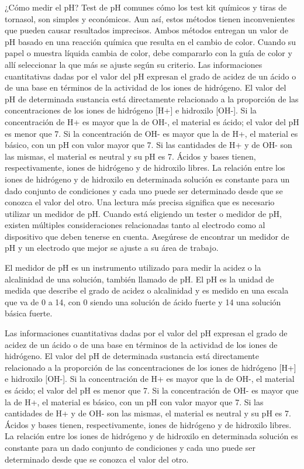 

¿Cómo medir el pH?
Test de pH comunes cómo los test kit químicos y tiras de tornasol, son simples y económicos. Aun así, estos métodos tienen inconvenientes que pueden causar resultados imprecisos. Ambos métodos entregan un valor de pH basado en una reacción química que resulta en el cambio de color. Cuando su papel o muestra líquida cambia de color, debe compararlo con la guía de color y allí seleccionar la que más se ajuste según su criterio.
Las informaciones cuantitativas dadas por el valor del pH expresan el grado de acidez de un ácido o de una base en términos de la actividad de los iones de hidrógeno. El valor del pH de determinada sustancia está directamente relacionado a la proporción de las concentraciones de los iones de hidrógeno [H+] e hidroxilo [OH-]. 
Si la concentración de H+ es mayor que la de OH-, el material es ácido; el valor del pH es menor que 7. 
Si la concentración de OH- es mayor que la de H+, el material es básico, con un pH con valor mayor que 7. 
Si las cantidades de H+ y de OH- son las mismas, el material es neutral y su pH es 7. Ácidos y bases tienen, respectivamente, iones de hidrógeno y de hidroxilo libres. La relación entre los iones de hidrógeno y de hidroxilo en determinada solución es constante para un dado conjunto de condiciones y cada uno puede ser determinado desde que se conozca el valor del otro.
Una lectura más precisa significa que es necesario utilizar un medidor de pH. Cuando está eligiendo un tester o medidor de pH, existen múltiples consideraciones relacionadas tanto al electrodo como al dispositivo que deben tenerse en cuenta. Asegúrese de encontrar un medidor de pH y un electrodo que mejor se ajuste a su área de trabajo.


El medidor de pH es un instrumento utilizado para medir la acidez o la alcalinidad de una solución, también llamado de pH. El pH es la unidad de medida que describe el grado de acidez o alcalinidad y es medido en una escala que va de 0 a 14, con 0 siendo una solución de ácido fuerte y 14 una solución básica fuerte.

Las informaciones cuantitativas dadas por el valor del pH expresan el grado de acidez de un ácido o de una base en términos de la actividad de los iones de hidrógeno. El valor del pH de determinada sustancia está directamente relacionado a la proporción de las concentraciones de los iones de hidrógeno [H+] e hidroxilo [OH-]. Si la concentración de H+ es mayor que la de OH-, el material es ácido; el valor del pH es menor que 7. Si la concentración de OH- es mayor que la de H+, el material es básico, con un pH con valor mayor que 7. Si las cantidades de H+ y de OH- son las mismas, el material es neutral y su pH es 7. Ácidos y bases tienen, respectivamente, iones de hidrógeno y de hidroxilo libres. La relación entre los iones de hidrógeno y de hidroxilo en determinada solución es constante para un dado conjunto de condiciones y cada uno puede ser determinado desde que se conozca el valor del otro.





